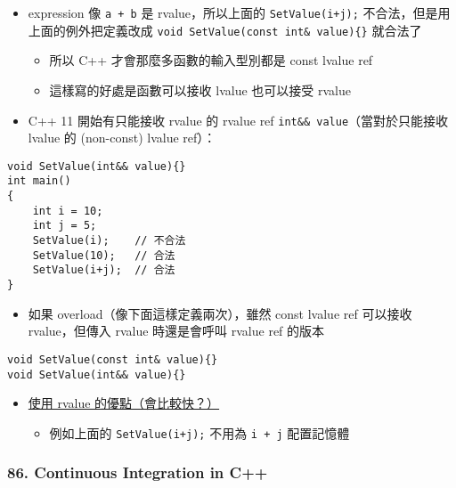 \documentclass[11pt]{article}
\providecommand{\tightlist}{%
      \setlength{\itemsep}{0pt}\setlength{\parskip}{0pt}}
\begin{document}
\begin{itemize}
\tightlist
\item
  expression 像 \texttt{a\ +\ b} 是 rvalue，所以上面的
  \texttt{SetValue(i+j);} 不合法，但是用上面的例外把定義改成
  \texttt{void\ SetValue(const\ int\&\ value)\{\}} 就合法了

  \begin{itemize}
  \tightlist
  \item
    所以 C++ 才會那麼多函數的輸入型別都是 const lvalue ref
  \item
    這樣寫的好處是函數可以接收 lvalue 也可以接受 rvalue
  \end{itemize}
\item
  C++ 11 開始有只能接收 rvalue 的 rvalue ref
  \texttt{int\&\&\ value}（當對於只能接收 lvalue 的 (non-const) lvalue
  ref）：
\end{itemize}

\begin{verbatim}
void SetValue(int&& value){}
int main()
{
    int i = 10;
    int j = 5;
    SetValue(i);    // 不合法
    SetValue(10);   // 合法
    SetValue(i+j);  // 合法
}
\end{verbatim}

\begin{itemize}
\tightlist
\item
  如果 overload（像下面這樣定義兩次），雖然 const lvalue ref 可以接收
  rvalue，但傳入 rvalue 時還是會呼叫 rvalue ref 的版本
\end{itemize}

\begin{verbatim}
void SetValue(const int& value){}
void SetValue(int&& value){}
\end{verbatim}

\begin{itemize}
\tightlist
\item
  \href{https://youtu.be/fbYknr-HPYE?list=PLlrATfBNZ98dudnM48yfGUldqGD0S4FFb\&t=692}{使用
  rvalue 的優點（會比較快？）}

  \begin{itemize}
  \tightlist
  \item
    例如上面的 \texttt{SetValue(i+j);} 不用為 \texttt{i\ +\ j}
    配置記憶體
  \end{itemize}
\end{itemize}

\hypertarget{continuous-integration-in-c}{%
\subsubsection{86. Continuous Integration in
C++}\label{continuous-integration-in-c}}
\end{document}
